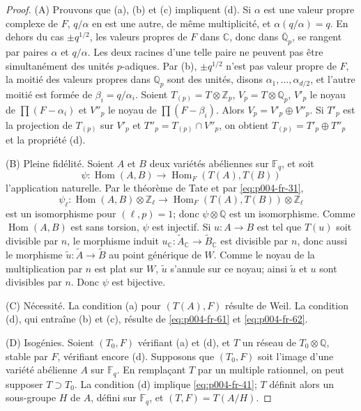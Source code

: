 \documentclass[12pt]{article}
\DeclareMathOperator{\Hom}{Hom}
\newcommand{\Z}{\mathbb{Z}}
\newcommand{\Q}{\mathbb{Q}}
\newcommand{\C}{\mathbb{C}}
\newcommand{\F}{\mathbb{F}}
\theoremstyle{plain}
\theoremstyle{definition}
\theoremstyle{remark}
\begin{document}
\begin{proof}
(A) Prouvons que (a), (b) et (c) impliquent (d). Si $\alpha$ est une valeur propre complexe de $F$, $q/\alpha$ en est une autre, de même multiplicité, et $\alpha(q/\alpha)=q$. En dehors du cas $\pm q^{1/2}$, les valeurs propres de $F$ dans $\C$, donc dans $\overline{\Q}_p$, se rangent par paires $\alpha$ et $q/\alpha$. Les deux racines d'une telle paire ne peuvent pas être simultanément des unités $p$-adiques. Par (b), $\pm q^{1/2}$ n'est pas valeur propre de $F$, la moitié des valeurs propres dans $\Q_p$ sont des unités, disons $\alpha_1,\ldots,\alpha_{d/2}$, et l'autre moitié est formée de $\beta_i=q/\alpha_i$. Soient $T_{(p)}=T\otimes\Z_p$, $V_p=T\otimes\Q_p$, $V'_p$ le noyau de $\prod(F-\alpha_i)$ et $V''_p$ le noyau de $\prod(F-\beta_i)$. Alors $V_p=V'_p\oplus V''_p$. Si $T'_p$ est la projection de $T_{(p)}$ sur $V'_p$ et $T''_p=T_{(p)}\cap V''_p$, on obtient $T_{(p)}=T'_p\oplus T''_p$ et la propriété (d).

(B) Pleine fidélité. Soient $A$ et $B$ deux variétés abéliennes sur $\F_q$, et soit
\[
 \psi:\Hom(A,B)\longrightarrow \Hom_F(T(A),T(B))
\]
l'application naturelle. Par le théorème de Tate et par \eqref{eq:p004-fr-31},
\[
 \psi_\ell:\Hom(A,B)\otimes\Z_\ell\longrightarrow \Hom_F(T(A),T(B))\otimes\Z_\ell
\]
est un isomorphisme pour $(\ell,p)=1$; donc $\psi\otimes\Q$ est un isomorphisme. Comme $\Hom(A,B)$ est sans torsion, $\psi$ est injectif. Si $u:A\to B$ est tel que $T(u)$ soit divisible par $n$, le morphisme induit $u_\C:\widetilde A_\C\to\widetilde B_\C$ est divisible par $n$, donc aussi le morphisme $\widetilde u:\widetilde A\to\widetilde B$ au point générique de $W$. Comme le noyau de la multiplication par $n$ est plat sur $W$, $\widetilde u$ s'annule sur ce noyau; ainsi $\widetilde u$ et $u$ sont divisibles par $n$. Donc $\psi$ est bijective.

(C) Nécessité. La condition (a) pour $(T(A),F)$ résulte de Weil. La condition (d), qui entraîne (b) et (c), résulte de \eqref{eq:p004-fr-61} et \eqref{eq:p004-fr-62}.

(D) Isogénies. Soient $(T_0,F)$ vérifiant (a) et (d), et $T$ un réseau de $T_0\otimes\Q$, stable par $F$, vérifiant encore (d). Supposons que $(T_0,F)$ soit l'image d'une variété abélienne $A$ sur $\F_q$. En remplaçant $T$ par un multiple rationnel, on peut supposer $T\supset T_0$. La condition (d) implique \eqref{eq:p004-fr-41}; $T$ définit alors un sous-groupe $H$ de $A$, défini sur $\F_q$, et $(T,F)=T(A/H)$.


\end{proof}
\end{document}

